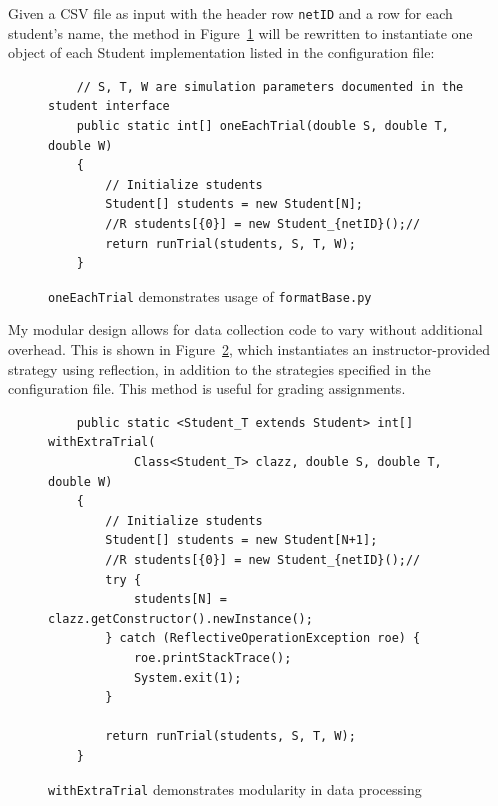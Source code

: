 \documentclass[pageno]{jpaper}
\begin{document}
Given a CSV file as input with the header row \texttt{netID} and a row for each student's name, the method in Figure~\ref{minted:oneEachTrial} will be rewritten to instantiate one object of each Student implementation listed in the configuration file:
\begin{figure}[hbt]
\begin{verbatim}
    // S, T, W are simulation parameters documented in the student interface
    public static int[] oneEachTrial(double S, double T, double W)
    {
        // Initialize students
        Student[] students = new Student[N];
        //R students[{0}] = new Student_{netID}();//
        return runTrial(students, S, T, W);
    }
\end{verbatim}
  \caption{\texttt{oneEachTrial} demonstrates usage of \texttt{formatBase.py}}\label{minted:oneEachTrial}
\end{figure}
My modular design allows for data collection code to vary without additional overhead.
This is shown in Figure~\ref{minted:withExtraTrial}, which instantiates an instructor-provided strategy using reflection, in addition to the strategies specified in the configuration file.
This method is useful for grading assignments.
\begin{figure}[hbt]
\begin{verbatim}
    public static <Student_T extends Student> int[] withExtraTrial(
            Class<Student_T> clazz, double S, double T, double W)
    {
        // Initialize students
        Student[] students = new Student[N+1];
        //R students[{0}] = new Student_{netID}();//
        try {
            students[N] = clazz.getConstructor().newInstance();
        } catch (ReflectiveOperationException roe) {
            roe.printStackTrace();
            System.exit(1);
        }

        return runTrial(students, S, T, W);
    }
\end{verbatim}
  \caption{\texttt{withExtraTrial} demonstrates modularity in data processing}\label{minted:withExtraTrial}
\end{figure}
\end{document}
